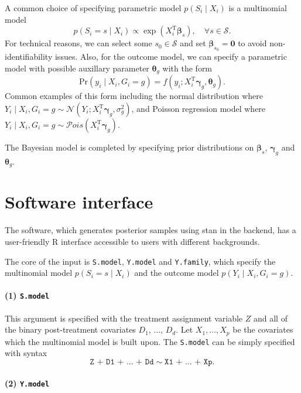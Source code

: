 \documentclass{article}
\begin{document}
A common choice of specifying parametric model $p(S_i\mid X_i)$ is a multinomial model $$p(S_i = s\mid X_i) \propto \exp(X_i^\mathrm{T} \boldsymbol{\beta}_s), \quad\forall s \in \mathcal{S}.$$ For technical reasons, we can select some $s_0\in\mathcal{S}$ and set $\boldsymbol{\beta}_{s_0} = \boldsymbol{0}$ to avoid non-identifiability issues. Also, for the outcome model, we can specify a parametric model with possible auxillary parameter $\boldsymbol{\theta}_g$ with the form $$\mathrm{Pr}(y_i\mid X_i, G_i = g) = f(y_i; X_i^\mathrm{T}\boldsymbol{\gamma}_g, \boldsymbol{\theta}_g).$$
Common examples of this form including the normal distribution where $Y_i \mid X_i, G_i = g \sim \mathcal{N}(Y_i; X_i^\mathrm{T}\boldsymbol{\gamma}_g, \sigma_g^2)$, and Poisson regression model where $Y_i\mid X_i, G_i = g\sim \mathcal{P}ois(X_i^\mathrm{T}\boldsymbol{\gamma}_g)$.

The Bayesian model is completed by specifying prior distributions on $\boldsymbol{\beta}_s$, $\boldsymbol{\gamma}_g$ and $\boldsymbol{\theta}_g$.

\section{Software interface}

The software, which generates posterior samples using stan in the backend, has a user-friendly \textsf{R} interface accessible to users with different backgrounds.

The core of the input is \texttt{S.model}, \texttt{Y.model} and \texttt{Y.family}, which specify the multinomial model $p(S_i = s\mid X_i)$ and the outcome model $p(Y_i\mid X_i, G_i = g)$. 

\paragraph{(1) \texttt{S.model}}

This argument is specified with the treatment assignment variable $Z$ and all of the binary post-treatment covariates $D_1$, $\dots$, $D_d$. Let $X_1, \dots, X_p$ be the covariates which the multinomial model is built upon. The \texttt{S.model} can be simply specified with syntax $$\texttt{Z + D1 + ... + Dd}\sim \texttt{X1 + ... + Xp}.$$

\paragraph{(2) \texttt{Y.model}}
\end{document}
